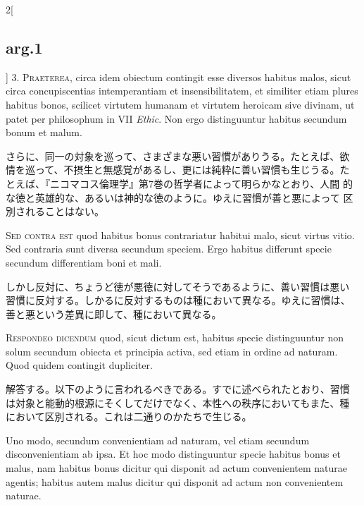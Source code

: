 \documentclass[paper=a4paper,fontsize=10pt,jafontsize=9pt,titlepage]{jlreq}
\begin{document}
\begin{paracol}{2}[\subsection{arg.1}]
3. {\scshape Praeterea}, circa idem obiectum contingit esse diversos
habitus malos, sicut circa concupiscentias intemperantiam et
insensibilitatem, et similiter etiam plures habitus bonos, scilicet
virtutem humanam et virtutem heroicam sive divinam, ut patet per
philosophum in VII {\itshape Ethic}. Non ergo distinguuntur habitus
secundum bonum et malum.

\switchcolumn

さらに、同一の対象を巡って、さまざまな悪い習慣がありうる。たとえば、欲
情を巡って、不摂生と無感覚があるし、更には純粋に善い習慣も生じうる。た
とえば、『ニコマコス倫理学』第7巻の哲学者によって明らかなとおり、人間
的な徳と英雄的な、あるいは神的な徳のように。ゆえに習慣が善と悪によって
区別されることはない。

\switchcolumn*[\subsection{s.c.}]

{\scshape Sed contra est} quod habitus bonus contrariatur habitui
malo, sicut virtus vitio. Sed contraria sunt diversa secundum
speciem. Ergo habitus differunt specie secundum differentiam boni et
mali.

\switchcolumn

しかし反対に、ちょうど徳が悪徳に対してそうであるように、善い習慣は悪い
習慣に反対する。しかるに反対するものは種において異なる。ゆえに習慣は、
善と悪という差異に即して、種において異なる。


{\scshape Respondeo dicendum} quod, sicut dictum est, habitus specie
distinguuntur non solum secundum obiecta et principia activa, sed
etiam in ordine ad naturam. Quod quidem contingit dupliciter.

\switchcolumn

解答する。以下のように言われるべきである。すでに述べられたとおり、習慣
は対象と能動的根源にそくしてだけでなく、本性への秩序においてもまた、種
において区別される。これは二通りのかたちで生じる。

\switchcolumn*

Uno modo, secundum convenientiam ad naturam, vel etiam secundum
disconvenientiam ab ipsa. Et hoc modo distinguuntur specie habitus
bonus et malus, nam habitus bonus dicitur qui disponit ad actum
convenientem naturae agentis; habitus autem malus dicitur qui disponit
ad actum non convenientem naturae.


\end{paracol}
\end{document}
